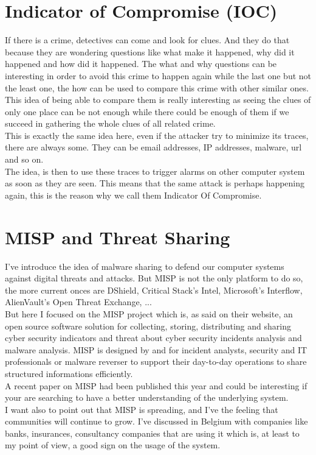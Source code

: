 \documentclass{eplmastersthesis}
\begin{document}
\section{Indicator of Compromise (IOC)}
If there is a crime, detectives can come and look for clues. And they do that because they are wondering questions like what make it happened, why did it happened and how did it happened. The what and why questions can be interesting in order to avoid this crime to happen again while the last one but not the least one, the how can be used to compare this crime with other similar ones.\\
This idea of being able to compare them is really interesting as seeing the clues of only one place can be not enough while there could be enough of them if we succeed in gathering the whole clues of all related crime.\\
This is exactly the same idea here, even if the attacker try to minimize its traces, there are always some. They can be email addresses, IP addresses, malware, url and so on.\\
The idea, is then to use these traces to trigger alarms on other computer system as soon as they are seen. This means that the same attack is perhaps happening again, this is the reason why we call them Indicator Of Compromise.


\section{MISP and Threat Sharing}
I've introduce the idea of malware sharing to defend our computer systems against digital threats and attacks. But MISP is not the only platform to do so, the more current onces are DShield, Critical Stack’s Intel, Microsoft’s Interflow, AlienVault’s Open Threat Exchange, ...\\
But here I focused on the MISP project which is, as said on their website, an open source software solution for collecting, storing, distributing and sharing cyber security indicators and threat about cyber security incidents analysis and malware analysis. MISP is designed by and for incident analysts, security and IT professionals or malware reverser to support their day-to-day operations to share structured informations efficiently.\\
A recent paper on MISP \cite{wagner2016misp} had been published this year and could be interesting if your are searching to have a better understanding of the underlying system.\\
I want also to point out that MISP is spreading, and I've the feeling that communities will continue to grow. I've discussed in Belgium with companies like banks, insurances, consultancy companies that are using it which is, at least to my point of view, a good sign on the usage of the system.
\end{document}
